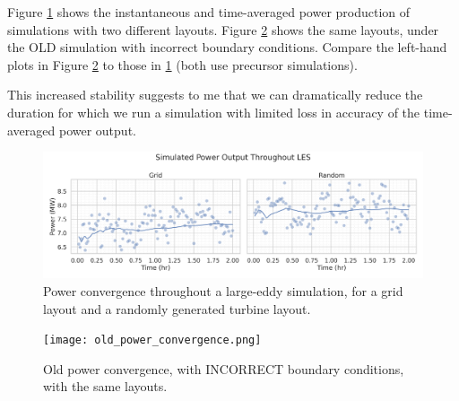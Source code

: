 \documentclass[11pt]{article}
\begin{document}
Figure \ref{fig:power_convergence} shows the instantaneous and time-averaged
power production of simulations with two different layouts. Figure
\ref{fig:old_power_convergence} shows the same layouts, under the OLD
simulation with incorrect boundary conditions. Compare the left-hand plots in
Figure \ref{fig:old_power_convergence} to those in \ref{fig:power_convergence} (both
use precursor simulations).

This increased stability suggests to me that we can dramatically reduce the
duration for which we run a simulation with limited loss in accuracy of the
time-averaged power output.

\begin{figure}[htbp]
    \centering
    \includegraphics[scale=0.4]{power_convergence.png}
    \caption{Power convergence throughout a large-eddy simulation, for a grid
    layout and a randomly generated turbine layout.}
    \label{fig:power_convergence}
\end{figure}

\begin{figure}[htbp]
    \centering
    \texttt{[image: old\_power\_convergence.png]}
    \caption{Old power convergence, with INCORRECT boundary conditions, with the same layouts.}
    \label{fig:old_power_convergence}
\end{figure}
\end{document}

